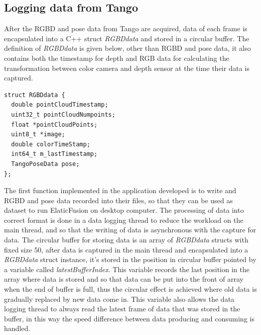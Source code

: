 \documentclass[12pt,twoside]{article}
\begin{document}
\subsection{Logging data from Tango}
After the RGBD and pose data from Tango are acquired, data of each frame is encapsulated into a C++ struct \textit{RGBDdata} and stored in a circular buffer. The definition of \textit{RGBDdata} is given below, other than RGBD and pose data, it also contains both the timestamp for depth and RGB data for calculating the transformation between color camera and depth sensor at the time their data is captured.\\
\begin{lstlisting}
struct RGBDdata {
  double pointCloudTimestamp;
  uint32_t pointCloudNumpoints;
  float *pointCloudPoints;
  uint8_t *image;
  double colorTimeStamp;
  int64_t m_lastTimestamp;
  TangoPoseData pose;
};
\end{lstlisting}
The first function implemented in the application developed is to write and RGBD and pose data recorded into their files, so that they can be used as dataset to run ElaticFusion on desktop computer. The processing of data into correct format is done in a data logging thread to reduce the workload on the main thread, and so that the writing of data is asynchronous with the capture for data. The circular buffer for storing data is an array of \textit{RGBDdata} structs with fixed size 50, after data is captured in the main thread and encapsulated into a \textit{RGBDdata} struct instance, it's stored in the position in circular buffer pointed by a variable called
\textit{latestBufferIndex}. This variable records the last position in the array where data is stored and so that data can be put into the front of array when the end of buffer is full, thus the circular effect is achieved where old data is gradually replaced by new data come in. This variable also allows the data logging thread to always read the latest frame of data that was stored in the buffer, in this way the speed difference between data producing and consuming is handled.\\
\\
\end{document}
